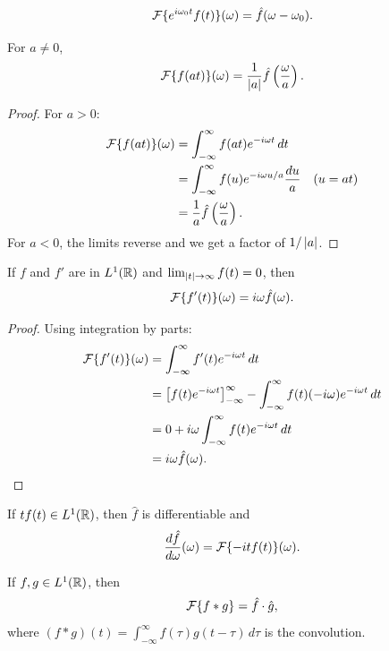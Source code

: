 \begin{notechapter}
\begin{proposition}
\[
\mathcal{F}\{e^{i\omega_0 t} f(t)\}(\omega) = \hat{f}(\omega - \omega_0).
\]
\end{proposition}

\begin{proposition}[Scaling]
For $a \neq 0$,
\[
\mathcal{F}\{f(at)\}(\omega) = \frac{1}{\left|a\right|} \hat{f}\left(\frac{\omega}{a}\right).
\]
\end{proposition}

\begin{proof}
For $a > 0$:
\begin{align*}
\mathcal{F}\{f(at)\}(\omega) &= \int_{-\infty}^{\infty} f(at) e^{-i\omega t} \, dt \\
&= \int_{-\infty}^{\infty} f(u) e^{-i\omega u/a} \frac{du}{a} \quad (u = at) \\
&= \frac{1}{a} \hat{f}\left(\frac{\omega}{a}\right).
\end{align*}
For $a < 0$, the limits reverse and we get a factor of $1/\left|a\right|$.
\end{proof}

\begin{proposition}
If $f$ and $f'$ are in $L^1(\mathbb{R})$ and $\lim_{\left|t\right| \to \infty} f(t) = 0$, then
\[
\mathcal{F}\{f'(t)\}(\omega) = i\omega \hat{f}(\omega).
\]
\end{proposition}

\begin{proof}
Using integration by parts:
\begin{align*}
\mathcal{F}\{f'(t)\}(\omega) &= \int_{-\infty}^{\infty} f'(t) e^{-i\omega t} \, dt \\
&= \left[ f(t) e^{-i\omega t} \right]_{-\infty}^{\infty} - \int_{-\infty}^{\infty} f(t) (-i\omega) e^{-i\omega t} \, dt \\
&= 0 + i\omega \int_{-\infty}^{\infty} f(t) e^{-i\omega t} \, dt \\
&= i\omega \hat{f}(\omega).
\end{align*}
\end{proof}

\begin{proposition}
If $tf(t) \in L^1(\mathbb{R})$, then $\hat{f}$ is differentiable and
\[
\frac{d\hat{f}}{d\omega}(\omega) = \mathcal{F}\{-it f(t)\}(\omega).
\]
\end{proposition}

\begin{proposition}
If $f, g \in L^1(\mathbb{R})$, then
\[
\mathcal{F}\{f * g\} = \hat{f} \cdot \hat{g},
\]
where $(f * g)(t) = \int_{-\infty}^{\infty} f(\tau) g(t - \tau) \, d\tau$ is the convolution.
\end{proposition}


\end{notechapter}
